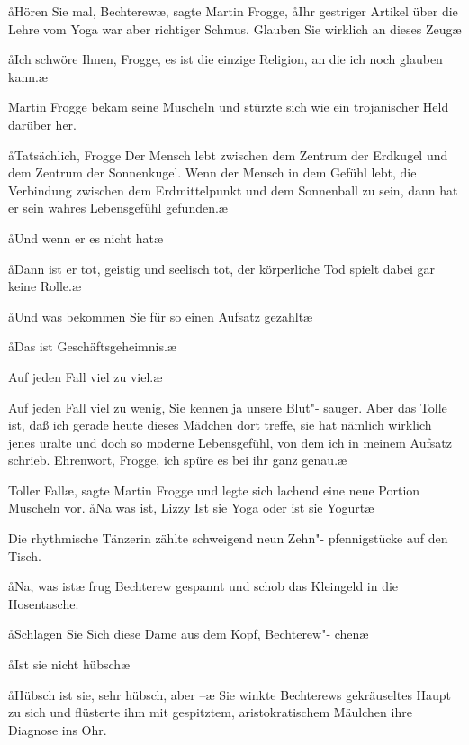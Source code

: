 \aa{}Hören Sie mal, Bechterew\ae{}, sagte Martin Frogge, \aa{}Ihr
gestriger Artikel über die Lehre vom Yoga war aber richtiger
Schmus. Glauben Sie wirklich an dieses Zeug\frag{}\ae{}

\aa{}Ich schwöre Ihnen, Frogge, es ist die einzige Religion, an
die ich noch glauben kann.\ae{}

Martin Frogge bekam seine Muscheln und stürzte sich wie ein
trojanischer Held darüber her.

\aa{}Tatsächlich, Frogge\ausr{} Der Mensch lebt zwischen dem Zentrum
der Erdkugel und dem Zentrum der Sonnenkugel. Wenn der
Mensch in dem Gefühl lebt, die Verbindung zwischen dem
Erdmittelpunkt und dem Sonnenball zu sein, dann hat er
sein wahres Lebensgefühl gefunden.\ae{}

\aa{}Und wenn er es nicht hat\frag{}\ae{}

\aa{}Dann ist er tot, geistig und seelisch tot, der körperliche Tod
spielt dabei gar keine Rolle.\ae{}

\aa{}Und was bekommen Sie für so einen Aufsatz gezahlt\frag{}\ae{}

\aa{}Das ist Geschäftsgeheimnis.\ae{}

\aanah{}Auf jeden Fall viel zu viel.\ae{}

\aanah{}Auf jeden Fall viel zu wenig, Sie kennen ja unsere Blut"-%
sauger. Aber das Tolle ist, daß ich gerade heute dieses
Mädchen dort treffe, sie hat nämlich wirklich jenes uralte und
doch so moderne Lebensgefühl, von dem ich in meinem
Aufsatz schrieb. Ehrenwort, Frogge, ich spüre es bei ihr ganz
genau.\ae{}

\aanah{}Toller Fall\ae{}, sagte Martin Frogge und legte sich lachend eine
neue Portion Muscheln vor. \aa{}Na was ist, Lizzy\frag{} Ist sie Yoga
oder ist sie Yogurt\frag{}\ae{}

Die rhythmische Tänzerin zählte schweigend neun Zehn"-%
pfennigstücke auf den Tisch.

\aa{}Na, was ist\frag{}\ae{} frug Bechterew gespannt und schob das
Kleingeld in die Hosentasche.

\aa{}Schlagen Sie Sich%
\eingriff{eS52-1}{Sich ] sich}
diese Dame aus dem Kopf, Bechterew"-%
chen\ausr{}\ae{}

\aa{}Ist sie nicht hübsch\frag{}\ae{}

\aa{}Hübsch ist sie, sehr hübsch, aber --\ae{} Sie winkte Bechterews
gekräuseltes Haupt zu sich und flüsterte ihm mit gespitztem,
aristokratischem Mäulchen ihre Diagnose ins Ohr.

